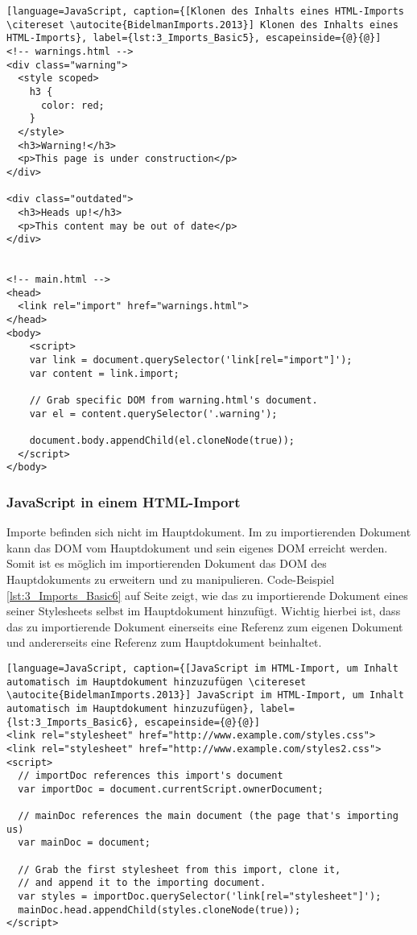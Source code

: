 \begin{lstlisting}[language=JavaScript, caption={[Klonen des Inhalts eines HTML-Imports \citereset \autocite{BidelmanImports.2013}] Klonen des Inhalts eines HTML-Imports}, label={lst:3_Imports_Basic5}, escapeinside={@}{@}]
<!-- warnings.html -->
<div class="warning">
  <style scoped>
    h3 {
      color: red;
    }
  </style>
  <h3>Warning!</h3>
  <p>This page is under construction</p>
</div>

<div class="outdated">
  <h3>Heads up!</h3>
  <p>This content may be out of date</p>
</div>


<!-- main.html -->
<head>
  <link rel="import" href="warnings.html">
</head>
<body>
    <script>
    var link = document.querySelector('link[rel="import"]');
    var content = link.import;

    // Grab specific DOM from warning.html's document.
    var el = content.querySelector('.warning');

    document.body.appendChild(el.cloneNode(true));
  </script>
</body>
\end{lstlisting}

\subsubsection{JavaScript in einem HTML-Import}

Importe befinden sich nicht im Hauptdokument.
Im zu importierenden Dokument kann das DOM vom Hauptdokument und sein eigenes DOM erreicht werden. Somit ist es möglich im importierenden Dokument das DOM des Hauptdokuments zu erweitern und zu manipulieren. Code-Beispiel \ref{lst:3_Imports_Basic6} auf Seite \pageref{lst:3_Imports_Basic6} zeigt, wie das zu importierende Dokument eines seiner Stylesheets selbst im Hauptdokument hinzufügt. Wichtig hierbei ist, dass das zu importierende Dokument einerseits eine Referenz zum eigenen Dokument und andererseits eine Referenz zum Hauptdokument beinhaltet.

\begin{lstlisting}[language=JavaScript, caption={[JavaScript im HTML-Import, um Inhalt automatisch im Hauptdokument hinzuzufügen \citereset \autocite{BidelmanImports.2013}] JavaScript im HTML-Import, um Inhalt automatisch im Hauptdokument hinzuzufügen}, label={lst:3_Imports_Basic6}, escapeinside={@}{@}]
<link rel="stylesheet" href="http://www.example.com/styles.css">
<link rel="stylesheet" href="http://www.example.com/styles2.css">
<script>
  // importDoc references this import's document
  var importDoc = document.currentScript.ownerDocument;

  // mainDoc references the main document (the page that's importing us)
  var mainDoc = document;

  // Grab the first stylesheet from this import, clone it,
  // and append it to the importing document.
  var styles = importDoc.querySelector('link[rel="stylesheet"]');
  mainDoc.head.appendChild(styles.cloneNode(true));
</script>
\end{lstlisting}

